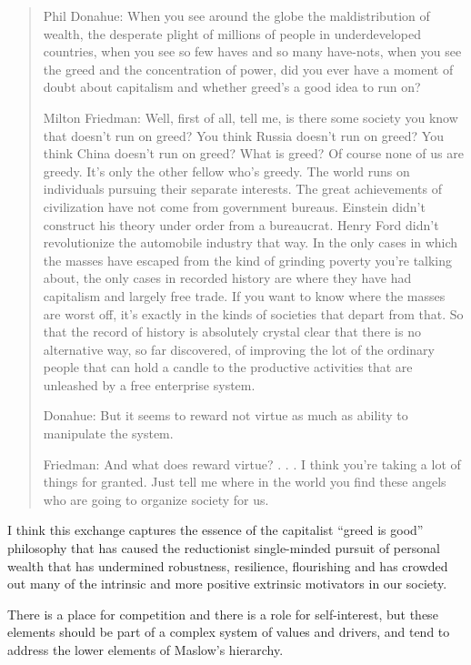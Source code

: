 \begin{quote}
Phil Donahue: When you see around the globe the maldistribution of wealth, the desperate plight of millions of people in underdeveloped countries, when you see so few haves and so many have-nots, when you see the greed and the concentration of power, did you ever have a moment of doubt about capitalism and whether greed’s a good idea to run on?

Milton Friedman: Well, first of all, tell me, is there some society you know that doesn’t run on greed? You think Russia doesn’t run on greed? You think China doesn’t run on greed? What is greed? Of course none of us are greedy. It’s only the other fellow who’s greedy. The world runs on individuals pursuing their separate interests. The great achievements of civilization have not come from government bureaus. Einstein didn’t construct his theory under order from a bureaucrat. Henry Ford didn’t revolutionize the automobile industry that way. In the only cases in which the masses have escaped from the kind of grinding poverty you’re talking about, the only cases in recorded history are where they have had capitalism and largely free trade. If you want to know where the masses are worst off, it’s exactly in the kinds of societies that depart from that. So that the record of history is absolutely crystal clear that there is no alternative way, so far discovered, of improving the lot of the ordinary people that can hold a candle to the productive activities that are unleashed by a free enterprise system.

Donahue: But it seems to reward not virtue as much as ability to manipulate the system.

Friedman: And what does reward virtue? . . . I think you’re taking a lot of things for granted. Just tell me where in the world you find these angels who are going to organize society for us.
\end{quote}

I think this exchange captures the essence of the capitalist ``greed is good'' philosophy that has caused the reductionist single-minded pursuit of personal wealth that has undermined robustness, resilience, flourishing and has crowded out many of the intrinsic and more positive extrinsic motivators in our society.

There is a place for competition and there is a role for self-interest, but these elements should be part of a complex system of values and drivers, and tend to address the lower elements of Maslow's hierarchy.

